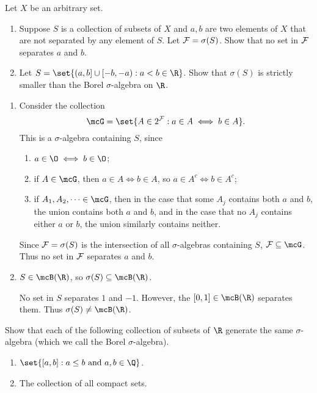 \documentclass[12pt]{article}
\begin{document}
\begin{problem}
    Let $X$ be an arbitrary set.
    \begin{enumerate}[(1)]
        \item Suppose $S$ is a collection of subsets of $X$ and $a, b$ are
        two elements of $X$ that are not separated by any element of $S$.
        Let $\mathcal F = \sigma(S)$.
        Show that no set in $\mathcal F$ separates $a$ and $b$.
        \item Let $S = \set{(a, b] \cup[-b, -a) : a < b \in \R}$.
        Show that $\sigma(S)$ is strictly smaller than the Borel
        $\sigma$-algebra on $\R$.
    \end{enumerate}
\end{problem}
\begin{solution} \leavevmode
    \begin{enumerate}[(1)]
        \item Consider the collection \[
            \mcG = \set{A \in 2^\F : a \in A \iff b \in A}.
        \] This is a $\sigma$-algebra containing $S$, since
        \begin{enumerate}
            \item $a \in \O \iff b \in \O$;
            \item if $A \in \mcG$, then $a \in A \iff b \in A$,
                so $a \in A^c \iff b \in A^c$;
            \item if $A_1, A_2, \dots \in \mcG$, then in the case that some
            $A_j$ contains both $a$ and $b$,
            the union contains both $a$ and $b$, and in the case that no
            $A_j$ contains either $a$ or $b$,
            the union similarly contains neither.
        \end{enumerate}
        Since $\mathcal F = \sigma(S)$ is the intersection of all $\sigma$-algebras
        containing $S$, $\F \subseteq \mcG$.
        Thus no set in $\mathcal F$ separates $a$ and $b$.
        \item $S \in \mcB(\R)$, so $\sigma(S) \subseteq \mcB(\R)$.

        No set in $S$ separates $1$ and $-1$.
        However, the $[0, 1] \in \mcB(\R)$ separates them.
        Thus $\sigma(S) \ne \mcB(\R)$.
    \end{enumerate}
\end{solution}

\begin{problem}
    Show that each of the following collection of subsets of $\R$ generate
    the same $\sigma$-algebra (which we call the Borel $\sigma$-algebra).
    \begin{enumerate}[(1)]
        \item $\set{[a, b] : a \le b \text{ and } a, b \in \Q}$.
        \item The collection of all compact sets.
    \end{enumerate}
\end{problem}
\end{document}
